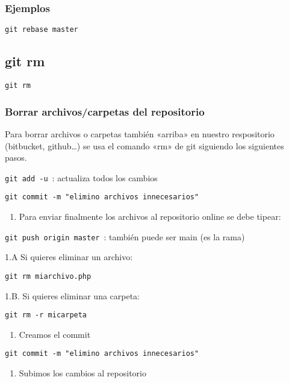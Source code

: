 \documentclass[
  a2paper,
]{article}
\providecommand{\tightlist}{%
  \setlength{\itemsep}{0pt}\setlength{\parskip}{0pt}}\usepackage{longtable,booktabs,array}
\begin{document}
\hypertarget{ejemplos-9}{%
\subsubsection{Ejemplos}\label{ejemplos-9}}

\texttt{git\ rebase\ master}

\hypertarget{git-rm}{%
\subsection{git rm}\label{git-rm}}

\texttt{git\ rm}

\hypertarget{borrar-archivoscarpetas-del-repositorio}{%
\subsubsection{Borrar archivos/carpetas del
repositorio}\label{borrar-archivoscarpetas-del-repositorio}}

Para borrar archivos o carpetas también «arriba» en nuestro respositorio
(bitbucket, github\ldots) se usa el comando «rm» de git siguiendo los
siguientes pasos.

\texttt{git\ add\ -u}~: actualiza todos los cambios

\texttt{git\ commit\ -m\ "elimino\ archivos\ innecesarios"}

\begin{enumerate}
\def\labelenumi{\arabic{enumi})}
\setcounter{enumi}{2}
\tightlist
\item
  Para enviar finalmente los archivos al repositorio online se debe
  tipear:
\end{enumerate}

\texttt{git\ push\ origin~master}~: también puede ser main (es la rama)

1.A Si quieres eliminar un archivo:

\texttt{git\ rm\ miarchivo.php}

1.B. Si quieres eliminar una carpeta:

\texttt{git\ rm\ -r\ micarpeta}

\begin{enumerate}
\def\labelenumi{\arabic{enumi}.}
\setcounter{enumi}{1}
\tightlist
\item
  Creamos el commit
\end{enumerate}

\texttt{git\ commit\ -m\ "elimino\ archivos\ innecesarios"}

\begin{enumerate}
\def\labelenumi{\arabic{enumi}.}
\setcounter{enumi}{2}
\tightlist
\item
  Subimos los cambios al repositorio
\end{enumerate}
\end{document}
